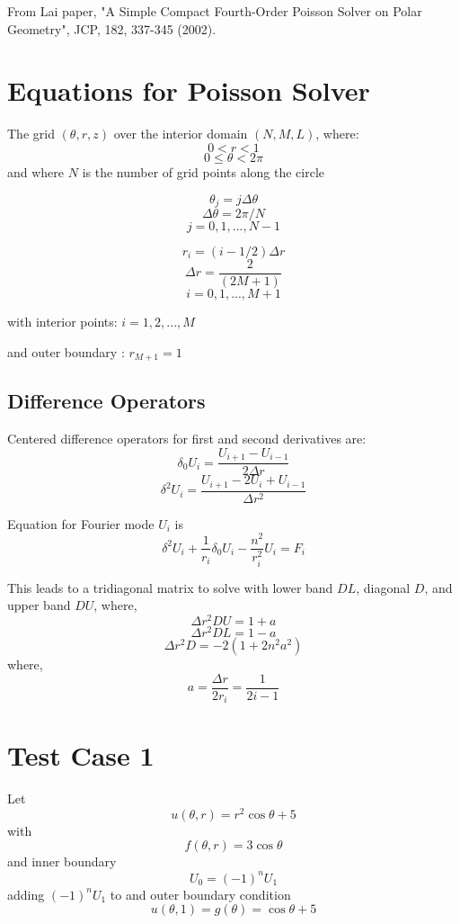\documentclass[12pt]{article}
\begin{document}
From Lai paper, "A Simple Compact Fourth-Order Poisson Solver on Polar Geometry", JCP, 182, 337-345 (2002).

\section*{Equations for Poisson Solver}

The grid $(\theta, r, z)$ over the interior domain $(N, M, L)$, where:
$$ 0 < r < 1$$
$$ 0 \leq \theta < 2 \pi $$
and where $N$ is the number of grid points along the circle


$$ \theta_j = j \Delta \theta $$
$$ \Delta \theta = 2 \pi / N $$
$$ j = 0, 1, ..., N-1$$

$$ r_i = (i - 1/2) \Delta r $$
$$  \Delta r = \frac{2}{(2 M + 1)}$$
$$ i = 0, 1, ..., M + 1$$

with interior points: \quad $i = 1, 2, ..., M$

and outer boundary : \quad $r_{M+1} = 1$

\subsection*{Difference Operators}

Centered difference operators for first and second derivatives are:
$$ \delta_0 U_i = \frac{U_{i+1} - U_{i-1}}{2 \Delta r}$$
$$ \delta^2 U_i = \frac{U_{i+1} - 2 U_i + U_{i-1}}{\Delta r^2}$$

Equation for Fourier mode $U_i$ is
$$ \delta^2 U_i + \frac{1}{r_i} \delta_0 U_i - \frac{n^2}{r_i^2} U_i = F_i $$

This leads to a tridiagonal matrix to solve with lower band $DL$, diagonal $D$, and upper band $DU$, where,
$$ \Delta r^2 DU = 1 + a$$
$$ \Delta r^2 DL = 1 - a$$
$$ \Delta r^2 D = -2 (1 + 2 n^2 a^2)$$
where,
$$ a = \frac{\Delta r}{2 r_i} = \frac{1}{2i-1}$$

\section*{Test Case 1}

Let
$$ u(\theta, r) = r^2 \cos \theta + 5 $$
with
$$ f(\theta, r) = 3 \cos \theta $$
and inner boundary 
$$ U_0 = (-1)^n U_1 $$
adding $(-1)^n U_1 $ to 
and outer boundary condition
$$ u(\theta, 1) = g(\theta) = \cos\theta + 5 $$
\end{document}
